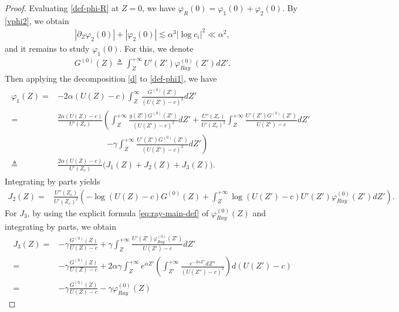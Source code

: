 \documentclass[10pt,a4paper]{amsart}
\begin{document}
				\begin{proof}
						Evaluating \eqref{def-phi-R} at $Z=0$, we have $\varphi_R(0)=\varphi_1(0)+\varphi_2(0)$. By \eqref{vphi2}, we obtain 
					\begin{align}
						|\partial_Z\varphi_2(0)|+|\varphi_2(0)|\lesssim \alpha^3|\log c_i|^2\ll \alpha^2,\label{phi2}
					\end{align}
					and it remains to study $\varphi_1(0)$. For this, we denote
						\begin{align}
							G^{(0)}(Z)\triangleq \int_{Z}^{+\infty}U'(Z')\varphi_{Ray}^{(0)}(Z')dZ'.\nonumber
						\end{align} 
		Then applying the decomposition \eqref{d} to \eqref{def-phi1}, we have	
						\begin{align}\label{phi1}\begin{aligned}
								\varphi_1(Z)=&-2\alpha(U(Z)-c)\int_{Z}^\infty\frac{G^{(0)}(Z')}{(U(Z')-c)^2}d Z'
								\\
								= & \frac{2\alpha (U(Z)-c)}{U'(Z_c)}\left(\int_{Z}^{+\infty}\frac{g(Z')G^{(0)}(Z')}{(U(Z')-c)^2}dZ'
								+\frac{U''(Z_c)}{U'(Z_c)^2}\int_{Z}^{+\infty}\frac{U'(Z')G^{(0)}(Z')}{U(Z')-c}dZ'\right.\\
								&\qquad\qquad\qquad\left.%
								-\gamma\int_{Z}^{+\infty}\frac{U'(Z')G^{(0)}(Z')}{(U(Z')-c)^2}dZ'\right)\\
								\triangleq &\frac{2\alpha (U(Z)-c)}{U'(Z_c)}\Big(J_1(Z)+J_2(Z)+J_3(Z)\Big).
						\end{aligned}\end{align}
				Integrating by parts yields
						\begin{align}\label{j2}
							J_2(Z)= & \frac{U''(Z_c)}{U'(Z_c)^2}\left(-\log(U(Z)-c)
							G^{(0)}(Z)
							+\int_{Z}^{+\infty}\log(U(Z')-c)U'(Z')\varphi^{(0)}_{Ray}(Z') dZ'\right). \end{align}
				For $J_3$, by using the explicit formula \eqref{eq:ray-main-def} of $\varphi^{(0)}_{Ray}(Z)$ and integrating by parts,  we obtain
						\begin{align}
							J_3(Z)= & -\gamma\frac{G^{(0)}(Z)}{U(Z)-c}     +\gamma\int_{Z}^{+\infty}\frac{U'(Z')\varphi_{Ray}^{(0)}(Z')}{U(Z')-c}dZ'\nonumber\\
							= & -\gamma\frac{G^{(0)}(Z)}{U(Z)-c}     +2\alpha\gamma\int_{Z}^{+\infty}e^{\alpha Z'}\left(\int_{Z'}^{+\infty}\frac{e^{-2\alpha Z''}dZ''}{(U(Z'')-c)^2}\right)d(U(Z')-c)\nonumber\\
							= &-\gamma\frac{G^{(0)}(Z)}{U(Z)-c}-\gamma\varphi_{Ray}^{(0)}(Z)

\end{align}
\end{proof}
\end{document}
